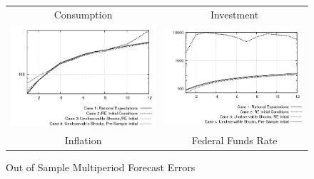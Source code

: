 \begin{figure}
\caption{Out of Sample Multiperiod Forecast Errors}\label{fg2:rmse}
\vspace*{1pc}\hspace*{-0.5in}
\begin{tabular}{cc}
Consumption & Investment \\ 
\includegraphics[scale=0.5]{consumption_fore.png} & \includegraphics[scale=0.5]{investment_fore.png} \\ 
Inflation & Federal Funds Rate \\ 

\end{tabular}
\end{figure}
